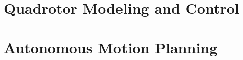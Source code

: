 \documentclass[
	twoside,openright,titlepage,numbers=noenddot,headinclude,
	footinclude=true,cleardoublepage=empty,
	dottedtoc, %
	BCOR=5mm,paper=a4,fontsize=11pt, %
	american, %
]{scrreprt}
\begin{document}
\frenchspacing %
\raggedbottom %
\pagestyle{plain} %

\cleardoublepage
\cleardoublepage
\pagestyle{scrheadings} %
\cleardoublepage
\cleardoublepage
{} %
\cleardoublepage %


\cleardoublepage %

\part{Quadrotor Modeling and Control}



\cleardoublepage %

\part{Autonomous Motion Planning}





\cleardoublepage %
\end{document}
